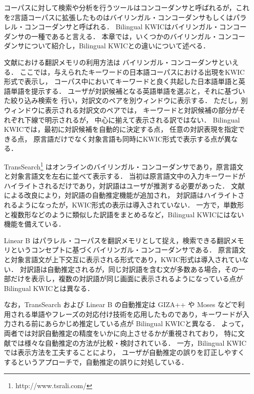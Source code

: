\documentclass[japanese]{jnlp_1.4}
\begin{document}
コーパスに対して検索や分析を行うツールはコンコーダンサと呼ばれるが，これを2言語コーパスに拡張したものはバイリンガル・コンコーダンサもしくはパラレル・コンコーダンサと呼ばれる．
Bilingual KWICはバイリンガル・コンコーダンサの一種であると言える．
本章では，いくつかのバイリンガル・コンコーダンサについて紹介し，Bilingual KWICとの違いについて述べる．

文献\cite{Uchiyama03b}における翻訳メモリの利用方法は
バイリンガル・コンコーダンサといえる．
ここでは，与えられたキーワードの日本語コーパスにおける出現をKWIC形式で表示し，
コーパス中においてキーワードと良く共起した日本語単語と英語単語を提示する．
ユーザが対訳候補となる英語単語を選ぶと，それに基づいた絞り込み検索を
行い，対訳文のペアを別ウィンドウに表示する．
ただし，別ウィンドウに表示される対訳文のペアでは，
キーワードと対訳候補の部分がそれぞれ下線で明示されるが，
中心に揃えて表示される訳ではない．
Bilingual KWICでは，最初に対訳候補を自動的に決定する点，
任意の対訳表現を指定できる点，
原言語だけでなく対象言語も同時にKWIC形式で表示する点が異なる．

TransSearch\footnote{http://www.tsrali.com/} \cite{Macklovitch} はオンラインのバイリンガル・コンコーダンサであり，原言語文と対象言語文を左右に並べて表示する．
当初は原言語文中の入力キーワードがハイライトされるだけであり，対訳語はユーザが推測する必要があった．
文献\cite{Bourdaillet10TS3MT}による改良により，対訳語の自動推定機能が追加され，
対訳語はハイライトされるようになったが，KWIC形式の表示は導入されていない．
一方で，単数形と複数形などのように類似した訳語をまとめるなど，Bilingual KWICにはない機能を備えている．

Linear B\cite{Callison}
はパラレル・コーパスを翻訳メモリとして捉え，検索できる翻訳メモリというコンセプトに基づくバイリンガル・コンコーダンサである．
原言語文と対象言語文が上下交互に表示される形式であり，KWIC形式は導入されていない．
対訳語は自動推定されるが，同じ対訳語を含む文が多数ある場合，その一部だけを表示し，複数の対訳語が同じ画面に表示されるようになっている点が
Bilingual KWICとは異なる．

なお，TransSearch および Linear B の自動推定は GIZA++ や Moses
などで利用される単語やフレーズの対応付け技術を応用したものであり，キーワードが入力される前にあらかじめ推定している点が
Bilingual KWICと異なる．
よって，両者では対訳自動推定の精度をいかに向上させるかが重視されており，
特に文献\cite{Bourdaillet10TS3MT}では様々な自動推定の方法が比較・検討されている．
一方，Bilingual KWICでは表示方法を工夫することにより，
ユーザが自動推定の誤りを訂正しやすくするというアプローチで，自動推定の誤りに対処している．
\end{document}
